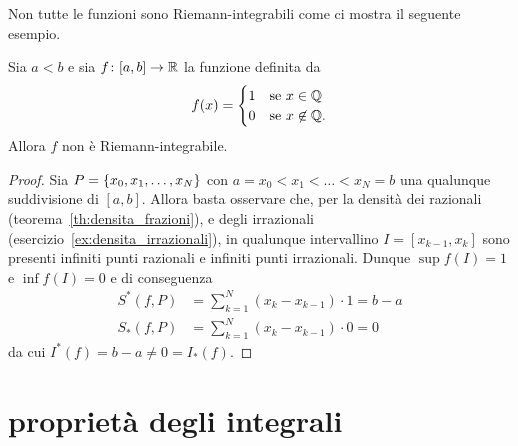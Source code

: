 Non tutte le funzioni sono Riemann-integrabili come ci mostra il seguente esempio.
\begin{example}
\mymark{**}
Sia $a<b$ e sia $f\colon[a,b]\to {\mathbb R}$ la funzione definita da
\[
 f(x) =
 \begin{cases}
   1 & \text{se $x\in {\mathbb Q}$}\\
   0 & \text{se $x\not \in {\mathbb Q}$}.
 \end{cases}
\]
Allora $f$ non è Riemann-integrabile.
\end{example}
%
\begin{proof}
\mymark{*}
Sia $P={\left\{ x_0, x_1, \dots, x_N \right\}}$ con $a=x_0 < x_1 < \dots < x_N = b$
una qualunque suddivisione di $[a,b]$.
Allora basta osservare che, per la densità dei razionali (teorema~\ref{th:densita_frazioni}),
e degli irrazionali (esercizio~\ref{ex:densita_irrazionali}),
in qualunque intervallino $I=[x_{k-1}, x_k]$ sono presenti infiniti punti
razionali e infiniti punti irrazionali. Dunque $\sup f(I)=1$ e $\inf f(I)=0$ e di conseguenza
\begin{align*}
  S^*(f,P) &= \sum_{k=1}^N (x_k - x_{k-1})\cdot 1 = b-a \\
  S_*(f,P) &= \sum_{k=1}^N (x_k - x_{k-1})\cdot 0 = 0
\end{align*}
da cui $I^*(f) = b-a \neq 0 = I_*(f)$.
\end{proof}

\section{proprietà degli integrali}
%
%

